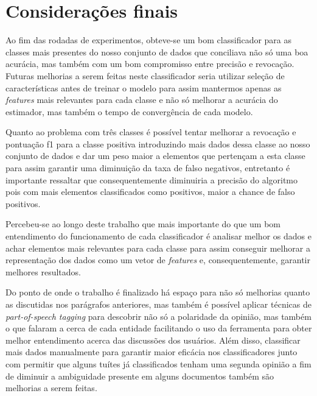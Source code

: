 \chapter{Considerações finais}

Ao fim das rodadas de experimentos, obteve-se um bom classificador
para as classes mais presentes do nosso conjunto de dados que conciliava
não só uma boa acurácia, mas também com um bom compromisso entre precisão e
revocação. Futuras melhorias a serem feitas neste classificador seria utilizar
seleção de características antes de treinar o modelo para assim mantermos apenas
as \textit{features} mais relevantes para cada classe e não só melhorar a acurácia
do estimador, mas também o tempo de convergência de cada modelo.

Quanto ao problema com três classes é possível tentar melhorar a revocação e pontuação
f1 para a classe positiva introduzindo mais dados dessa classe ao nosso conjunto de dados
e dar um peso maior a elementos que pertençam a esta classe para assim garantir uma diminuição
da taxa de falso negativos, entretanto é importante ressaltar que consequentemente diminuiria
a precisão do algoritmo pois com mais elementos classificados como positivos, maior a chance
de falso positivos.

Percebeu-se ao longo deste trabalho que mais importante do que um bom entendimento
do funcionamento de cada classificador é analisar melhor os dados e achar elementos
mais relevantes para cada classe para assim conseguir melhorar a representação dos dados
como um vetor de \textit{features} e, consequentemente, garantir melhores resultados.

Do ponto de onde o trabalho é finalizado há espaço para não só melhorias quanto as discutidas
nos parágrafos anteriores, mas também é possível aplicar técnicas de \textit{part-of-speech tagging}
para descobrir não só a polaridade da opinião, mas também o que falaram a cerca de cada entidade
facilitando o uso da ferramenta para obter melhor entendimento acerca das discussões dos usuários.
Além disso, classificar mais dados manualmente para garantir maior eficácia nos classificadores
junto com permitir que alguns tuítes já classificados tenham uma segunda opinião a fim de
diminuir a ambiguidade presente em alguns documentos também são melhorias a serem feitas.
